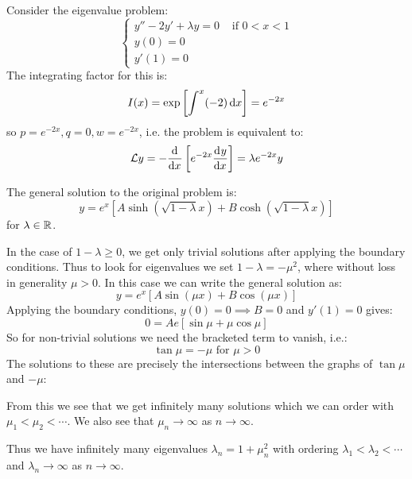\documentclass[../main.tex]{subfiles}
\begin{document}
\begin{example}
  Consider the eigenvalue problem:
  \[
    \begin{cases}
    y'' - 2y' + \lambda y = 0 & \text{ if } 0 < x < 1 \\
    y(0) = 0 &  \\
    y'(1) = 0 &
    \end{cases}
  \]
  The integrating factor for this is:
  \[
    I(x) = \exp\left[\int_{}^{x} (-2) \d{x}\right] = e^{-2x}
  \]
  so $p = e^{-2x}, q = 0, w = e^{-2x}$, i.e. the problem is equivalent to:
  \[
    \mathcal{L} y = -\deriv{}{x}\left[e^{-2x} \deriv{y}{x}\right] = \lambda e^{-2x} y
  \]

  The general solution to the original problem is:
  \[
    y = e^{x}[A \sinh(\sqrt{1 - \lambda} x) + B \cosh(\sqrt{1 - \lambda}x)]
  \]
  for $\lambda \in \mathbb{R}$.

  In the case of $1 - \lambda \geq 0$, we get only trivial solutions after applying the boundary conditions.
  Thus to look for eigenvalues we set $1 - \lambda = -\mu^2$, where without loss in generality $\mu > 0$.
  In this case we can write the general solution as:
  \[
    y = e^{x}[A \sin(\mu x) + B \cos(\mu x)]
  \]
  Applying the boundary conditions, $y(0) = 0 \implies B = 0$ and $y'(1) = 0$ gives:
  \[
    0 = A e [\sin \mu + \mu \cos \mu]
  \]
  So for non-trivial solutions we need the bracketed term to vanish, i.e.:
  \[
    \tan \mu = - \mu \text{ for } \mu > 0
  \]
  The solutions to these are precisely the intersections between the graphs of $\tan \mu$ and $-\mu$:
  \begin{center}
  \end{center}
  From this we see that we get infinitely many solutions which we can order with $\mu_1 < \mu_2 < \cdots$.
  We also see that $\mu_n \to \infty$ as $n \to \infty$.

  Thus we have infinitely many eigenvalues $\lambda_n = 1 + \mu^2_n$ with ordering $\lambda_1 < \lambda_2 < \cdots$ and $\lambda_n \to \infty$ as $n \to \infty$.


\end{example}
\end{document}
